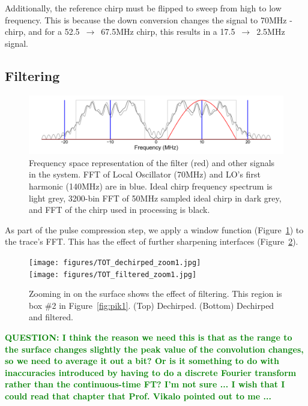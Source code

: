 \documentclass[11pt]{article}
\newcommand{\todo}[1]{\ifthenelse{\boolean{include-todos}} {\textcolor{Red}{\textbf{TODO: #1}}}{}}
\newcommand{\question}[1]{\ifthenelse{\boolean{include-questions}} {\textcolor{Green}{\textbf{QUESTION: #1}}}{}}
\newcommand{\figref}[1]{Figure~\ref{#1}}
\begin{document}
Additionally, the reference chirp must be flipped to sweep from high to low frequency. This is because the down conversion changes the signal to 70MHz - chirp, and for a 52.5~$\rightarrow$~67.5MHz chirp, this results in a 17.5~$\rightarrow$~2.5MHz signal. 


\subsection{Filtering}
\label{sec:filtering}

\begin{figure}[h!]
\centering
\includegraphics[width=1.0\columnwidth]{figures/filter_frequencies.png}
\caption[]{Frequency space representation of the filter (red) and other signals in the system. FFT of Local Oscillator (70MHz) and LO's first harmonic (140MHz) are in blue. Ideal chirp frequency spectrum is light grey, 3200-bin FFT of 50MHz sampled ideal chirp in dark grey, and FFT of the chirp used in processing is black.}
\label{fig:filter_freqs}
\end{figure}

As part of the pulse compression step, we apply a window function (\figref{fig:filter_freqs}) to the trace's FFT. This has the effect of further sharpening interfaces (\figref{fig:filtered}). 



\begin{figure}[h!]
\centering
\texttt{[image: figures/TOT\_dechirped\_zoom1.jpg]} \\
\vspace{2pt}
\texttt{[image: figures/TOT\_filtered\_zoom1.jpg]}
\caption[]{Zooming in on the surface shows the effect of filtering. This region is box \#2 in \figref{fig:pik1}. (Top) Dechirped. (Bottom) Dechirped and filtered.}
\label{fig:filtered}
\end{figure}

\question{I think the reason we need this is that as the range to the surface changes slightly the peak value of the convolution changes, so we need to average it out a bit? Or is it something to do with inaccuracies introduced by having to do a discrete Fourier transform rather than the continuous-time FT? I'm not sure ... I wish that I could read that chapter that Prof. Vikalo pointed out to me ...}
\end{document}
